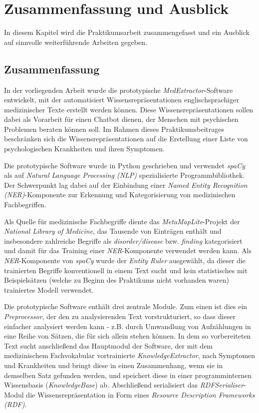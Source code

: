 \chapter{Zusammenfassung und Ausblick}
\label{ch:zusammenfassung}



In diesem Kapitel wird die Praktikumsarbeit zusammengefasst und ein Ausblick auf sinnvolle weiterführende Arbeiten gegeben.




\section{Zusammenfassung}
\label{sec:Zusammenfassung} 

In der vorliegenden Arbeit wurde die prototypische \emph{MedExtractor}-Software entwickelt, mit der automatisiert Wissensrepräsentationen englischsprachiger medizinischer Texte erstellt werden können. Diese Wissensrepräsentationen sollen dabei als Vorarbeit für einen Chatbot dienen, der Menschen mit psychischen Problemen beraten können soll. Im Rahmen dieses Praktikumsbeitrages beschränken sich die Wissensrepräsentationen auf die Erstellung einer Liste von psychologischen Krankheiten und ihren Symptomen. 

Die prototypische Software wurde in Python geschrieben und verwendet \emph{spaCy} als  auf \emph{Natural Language Processing (NLP)} spezialisierte Programmbibliothek. Der Schwerpunkt lag dabei auf der Einbindung einer \emph{Named Entity Recognition (NER)}-Komponente zur Erkennung und Kategorisierung von medizinischen Fachbegriffen.

Als Quelle für medizinische Fachbegriffe diente das \emph{MetaMapLite}-Projekt der \emph{National Library of Medicine}, das Tausende von Einträgen enthält und insbesondere zahlreiche Begriffe als \emph{disorder/disease} bzw. \emph{finding} kategorisiert und damit für das Training einer \emph{NER}-Komponente verwendet werden kann. Als \emph{NER}-Komponente von \emph{spaCy} wurde der \emph{Entity Ruler} ausgewählt, da dieser die trainierten Begriffe konventionell in einem Text sucht und kein statistisches mit Beispielsätzen (welche zu Beginn des Praktikums nicht vorhanden waren) trainiertes Modell verwendet.

Die prototypische Software enthält drei zentrale Module. Zum einen ist dies ein \emph{Preprocessor}, der den zu analysierenden Text vorstrukturiert, so dass dieser einfacher analysiert werden kann - z.B. durch Umwandlung von Aufzählungen in eine Reihe von Sätzen, die für sich allein stehen können. In dem so vorbereiteten Text sucht anschließend das Hauptmodul der Software, der mit dem medizinischem Fachvokabular vortrainierte \emph{KnowledgeExtractor}, nach Symptomen und Krankheiten und bringt diese in einen Zusammenhang, wenn sie in demselben Satz gefunden werden, und speichert diese in einer programminternen Wissensbasis (\emph{KnowledgeBase}) ab. Abschließend serialisiert das \emph{RDFSerialiser}-Modul die Wissensrepräsentation in Form eines \emph{Resource Description Frameworks (RDF)}.


